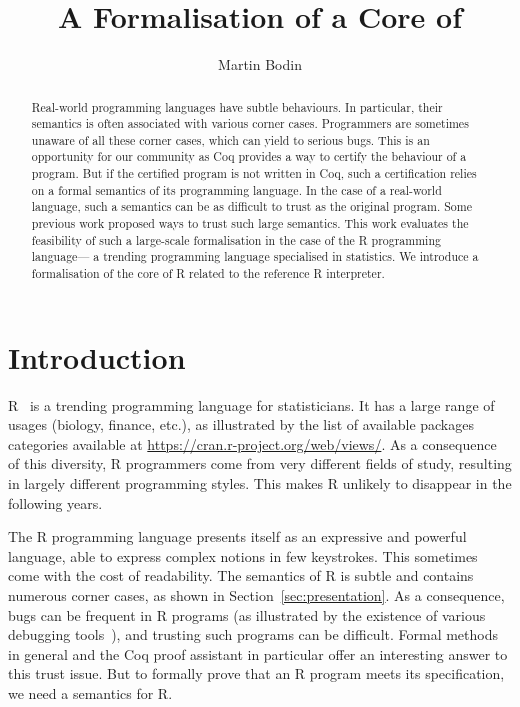 \documentclass[9pt, sigplan, natbib=false, screen=true]{acmart}
\title{A \Coq{} Formalisation of a Core of \R{}}
\author{Martin Bodin}
\affiliation{
    \institution{Center of Mathematical Modeling}
    \streetaddress{Beauchef 851}
    \city{Santiago}
    \country{Chile}
}
\newcommand\Coq{Coq}
\newcommand\R{R}
\begin{document}
\begin{abstract}
Real-world programming languages have subtle behaviours.
In particular, their semantics is often associated with
various corner cases.
Programmers are sometimes unaware of all these corner cases,
which can yield to serious bugs.
This is an opportunity for our community
as \Coq{} provides a way to certify the behaviour of a program.
But if the certified program is not written in \Coq{},
such a certification relies on a formal semantics of its programming language.
In the case of a real-world language, such a semantics
can be as difficult to trust as the original program.
Some previous work proposed ways to trust such large semantics.
This work evaluates the feasibility of such a large-scale formalisation
in the case of the \R{} programming language---%
a trending programming language specialised in statistics.
We introduce a formalisation of the core of \R{}
related to the reference \R{} interpreter.
\end{abstract}

\maketitle

\section{Introduction}
\label{sec:introduction}

\R{}~\parencite{ihaka1996r, Rwebsite} is a trending
programming language for statisticians.
It has a large range of usages (biology, finance, etc.),
as illustrated by the list of available packages categories
available at
\url{https://cran.r-project.org/web/views/}.
As a consequence of this diversity,
\R{} programmers come from very different fields of study,
resulting in largely different programming styles.
This makes \R{} unlikely to disappear
in the following years.

The \R{} programming language presents itself
as an expressive and powerful language,
able to express complex notions in few keystrokes.
This sometimes come with the cost of readability.
The semantics of \R{} is subtle
and contains numerous corner cases,
as shown in Section~\ref{sec:presentation}.
%
As a consequence, bugs can be frequent in \R{} programs
(as illustrated by the existence of various debugging tools~\parencite{mcpherson2014}),
and trusting such programs can be difficult.
Formal methods in general and the \Coq{} proof assistant in particular
offer an interesting answer to this trust issue.
But to formally prove that an \R{} program meets its specification,
we need a semantics for \R{}.
\end{document}
